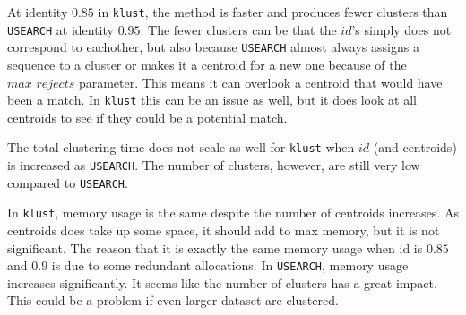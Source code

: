 At identity $0.85$ in \texttt{klust}, the method is faster and produces fewer
clusters than \texttt{USEARCH} at identity $0.95$. The fewer clusters can be
that the $id$'s simply does not correspond to eachother, but also because
\texttt{USEARCH} almost always assigns a sequence to a cluster or makes it a
centroid for a new one because of the $max\_rejects$ parameter. This means it
can overlook a centroid that would have been a match. In \texttt{klust} this
can be an issue as well, but it does look at all centroids to see if they
could be a potential match.

The total clustering time does not scale as well for \texttt{klust} when $id$
(and centroids) is increased as \texttt{USEARCH}. The number of clusters,
however, are still very low compared to \texttt{USEARCH}.

In \texttt{klust}, memory usage is the same despite the number of centroids
increases. As centroids does take up some space, it should add to max memory,
but it is not significant. The reason that it is exactly the same memory usage
when id is $0.85$ and $0.9$ is due to some redundant allocations. In \texttt{USEARCH}, memory usage increases significantly. It seems like
the number of clusters has a great impact. This could be a problem if even
larger dataset are clustered.
